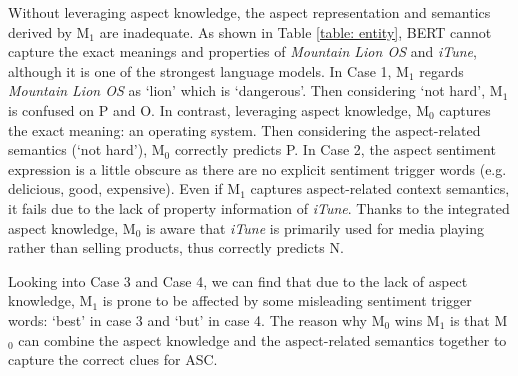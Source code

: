 Without leveraging aspect knowledge, the aspect representation and semantics derived by M$_1$ are inadequate. 
As shown in Table \ref{table: entity}, BERT cannot capture the exact meanings and properties of \textit{Mountain Lion OS} and \textit{iTune}, although it is one of the strongest language models. 
In Case 1, M$_1$ regards \textit{Mountain Lion OS} as `lion' which is `dangerous'. Then considering `not hard', M$_1$ is confused on P and O.
In contrast, leveraging aspect knowledge, M$_0$ captures the exact meaning: an operating system.
Then considering the aspect-related semantics (`not hard'), M$_0$ correctly predicts P.
In Case 2, the aspect sentiment expression is a little obscure as there are no explicit sentiment trigger words (e.g. delicious, good, expensive).
Even if M$_1$ captures aspect-related context semantics, it fails due to the lack of property information of \textit{iTune}.
Thanks to the integrated aspect knowledge, M$_0$ is aware that \textit{iTune} is primarily used for media playing rather than selling products, thus correctly predicts N.



Looking into Case 3 and Case 4, we can find that due to the lack of aspect knowledge, M$_1$ is prone to be affected by some misleading sentiment trigger words: `best' in case 3 and `but' in case 4.
The reason why M$_0$ wins M$_1$ is that M$_0$ can combine the aspect knowledge and the aspect-related semantics together to capture the correct clues for ASC.
\begin{table}[t]
\fontsize{8}{10}\selectfont
\centering
\caption{Misunderstanding from BERT presented by semantic cosine similarity ($S$). $v$ is the average of entity's hidden states.
 $a_i$ denotes the $\mathbf{A}$ in case $i$.}
\label{table: entity}
\end{table}

